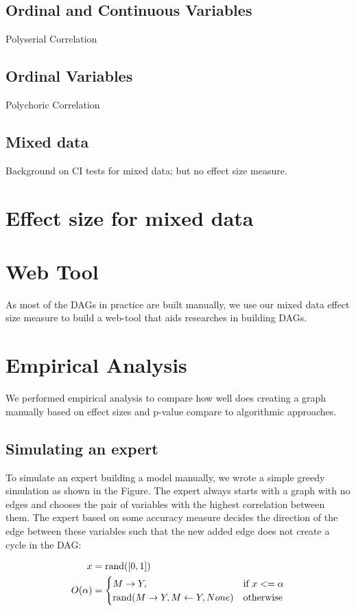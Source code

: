 \documentclass{article}
\begin{document}
\subsection{Ordinal and Continuous Variables}
Polyserial Correlation

\subsection{Ordinal Variables}
Polychoric Correlation

\subsection{Mixed data}
Background on CI tests for mixed data; but no effect size measure.

\section{Effect size for mixed data}

\section{Web Tool}
As most of the DAGs in practice are built manually, we use our mixed data effect size measure to build a web-tool that aids researches in building DAGs.

\section{Empirical Analysis}
We performed empirical analysis to compare how well does creating a graph manually based on effect sizes and p-value compare to algorithmic approaches.
\subsection{Simulating an expert}
To simulate an expert building a model manually, we wrote a simple greedy simulation as shown in the Figure. The expert always starts with a graph with
no edges and chooses the pair of variables with the highest correlation between them. The expert based on some accuracy measure decides the direction
of the edge between these variables such that the new added edge does not create a cycle in the DAG:

\begin{equation}
	\begin{split}
		x &= \textnormal{rand}([0, 1]) \\
		O(\alpha) &= \begin{cases} 
			M \rightarrow Y, & \textnormal{if  } x <= \alpha \\
			\textnormal{rand}(M \rightarrow Y, M \leftarrow Y, None) & \textnormal{otherwise} \\
			     \end{cases} \\
	\end{split}
\end{equation}
\end{document}
